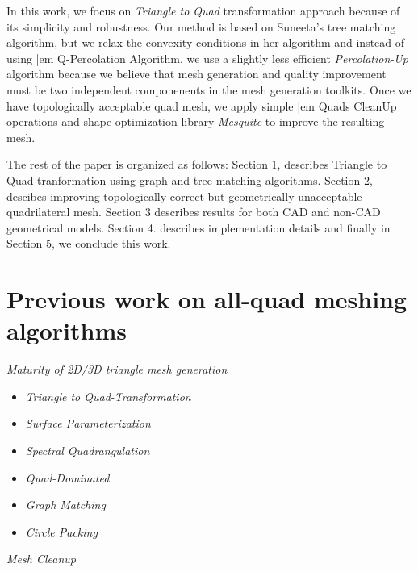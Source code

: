 \documentclass[11pt, a4paper]{paper}
\begin{document}
In this work, we focus on {\em Triangle to Quad} transformation approach because 
of its simplicity and robustness. Our method is based on Suneeta's tree
matching algorithm, but we relax the convexity conditions in her algorithm and
instead of using {|em Q-Percolation Algorithm}, we use a slightly less
efficient {\em Percolation-Up } algorithm because we believe that mesh
generation and quality improvement must be two independent componenents in the
mesh generation toolkits. Once we have topologically acceptable quad mesh,
we apply simple {|em Quads CleanUp } operations and shape optimization library
{\em Mesquite} to improve the resulting mesh.

The rest of the paper is organized as follows: Section 1, describes Triangle to Quad tranformation using graph and tree matching algorithms. Section 2, descibes improving topologically correct but geometrically unacceptable quadrilateral mesh. Section 3 describes results for both CAD and non-CAD geometrical models.
Section 4. describes implementation details and finally in Section 5, we conclude this work.

\section {Previous work on all-quad meshing algorithms}

\item {\em Maturity of  2D/3D triangle mesh generation}

\begin{itemize}
\item {\em Triangle to Quad-Transformation}
\item {\em Surface Parameterization }
\item {\em Spectral Quadrangulation }
\item {\em Quad-Dominated }
\item {\em Graph Matching }
\item {\em Circle Packing }
\end {itemize}

{\em Mesh Cleanup}

\end{document}
